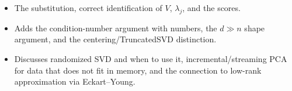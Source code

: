 \begin{interviewq}

\goodgreat
\begin{itemize}
    \item {} The substitution, correct identification of $V$, $\lambda_j$, and the scores.
    \item {} Adds the condition-number argument with numbers, the $d \gg n$ shape argument, and the centering/TruncatedSVD distinction.
    \item {} Discusses randomized SVD and when to use it, incremental/streaming PCA for data that does not fit in memory, and the connection to low-rank approximation via Eckart--Young.
\end{itemize}

\end{interviewq}

